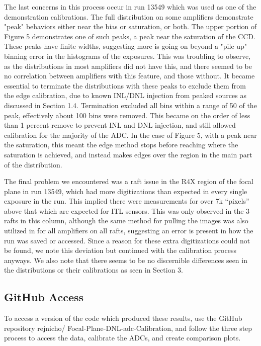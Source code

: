 \documentclass[11pt, letterpaper]{article}
\begin{document}
The last concerns in this process occur in run 13549 which was used as one of the demonstration calibrations. 
The full distribution on some amplifiers demonstrate "peak" behaviors either near the bias or saturation, or both.
The upper portion of Figure 5 demonstrates one of such peaks, a peak near the saturation of the CCD.  
These peaks have finite widths, suggesting more is going on beyond a "pile up" binning error in the histograms of the exposures. 
This was troubling to observe, as the distributions in most amplifiers did not have this, and there seemed to be no correlation between amplifiers with this feature, and those without. 
It became essential to terminate the distributions with these peaks to exclude them from the edge calibration, due to known INL/DNL injection from peaked sources as discussed in Section 1.4. 
Termination excluded all bins within a range of 50 of the peak, effectively about 100 bins were removed. 
This became on the order of less than 1 percent remove to prevent INL and DNL injection, and still allowed calibration for the majority of the ADC. 
In the case of Figure 5, with a peak near the saturation, this meant the edge method stops before reaching where the saturation is achieved, and instead makes edges over the region in the main part of the distribution. 
\indent


The final problem we encountered was a raft issue in the R4X region of the focal plane in run 13549, which had more digitizations than expected in every single exposure in the run. 
This implied there were measurements for over 7k “pixels” above that which are expected for ITL sensors. 
This was only observed in the 3 rafts in this column, although the same method for pulling the images was also utilized in for all amplifiers on all rafts, suggesting an error is present in how the run was saved or accessed. 
Since a reason for these extra digitizations could not be found, we note this deviation but continued with the calibration process anyways. 
We also note that there seems to be no discernible differences seen in the distributions or their calibrations as seen in Section 3. 

\subsection{GitHub Access}
\indent 


To access a version of the code which produced these results, use the GitHub repository rejnicho/
Focal-Plane-DNL-adc-Calibration, and follow the three step process to access the data, calibrate the ADCs, and create comparison plots. 
\end{document}
